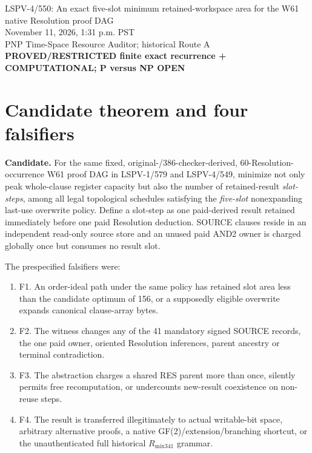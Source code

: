 \documentclass[11pt]{article}
\begin{document}
\begin{center}
{\Large LSPV-4/550: An exact five-slot minimum retained-workspace area for the W61 native Resolution proof DAG}\\[5pt]
November 11, 2026, 1:31 p.m. PST\\
PNP Time-Space Resource Auditor; historical Route A\\
\textbf{PROVED/RESTRICTED finite exact recurrence + COMPUTATIONAL; P versus NP OPEN}
\end{center}

\section*{Candidate theorem and four falsifiers}
\textbf{Candidate.} For the same fixed, original-/386-checker-derived, 60-Resolution-occurrence W61 proof DAG in LSPV-1/579 and LSPV-4/549, minimize not only peak whole-clause register capacity but also the number of retained-result \emph{slot-steps}, among all legal topological schedules satisfying the \emph{five-slot} nonexpanding last-use overwrite policy. Define a slot-step as one paid-derived result retained immediately before one paid Resolution deduction. SOURCE clauses reside in an independent read-only source store and an unused paid AND2 owner is charged globally once but consumes no result slot.

The prespecified falsifiers were:
\begin{enumerate}
\item[] F1. An order-ideal path under the same policy has retained slot area less than the candidate optimum of 156, or a supposedly eligible overwrite expands canonical clause-array bytes.
\item[] F2. The witness changes any of the 41 mandatory signed SOURCE records, the one paid owner, oriented Resolution inferences, parent ancestry or terminal contradiction.
\item[] F3. The abstraction charges a shared RES parent more than once, silently permits free recomputation, or undercounts new-result coexistence on non-reuse steps.
\item[] F4. The result is transferred illegitimately to actual writable-bit space, arbitrary alternative proofs, a native GF(2)/extension/branching shortcut, or the unauthenticated full historical $R_{\mathrm{mix341}}$ grammar.
\end{enumerate}
\end{document}
